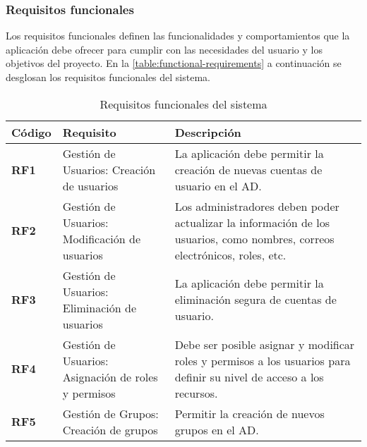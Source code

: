 \subsubsection{Requisitos funcionales}

Los requisitos funcionales definen las funcionalidades y comportamientos que la aplicación debe ofrecer para cumplir con las necesidades del usuario y los objetivos del proyecto. En la \autoref{table:functional-requirements} a continuación se desglosan los requisitos funcionales del sistema.



\begin{longtable}{|l|p{5cm}|p{8.5cm}|}
    \caption{Requisitos funcionales del sistema}
    \label{table:functional-requirements}                                                                                                                                                                                          \\
    \hline
    \textbf{Código} & \textbf{Requisito}                                                              & \textbf{Descripción}                                                                                                       \\
    \hline
    \endfirsthead
    \textbf{RF1}   & Gestión de Usuarios: Creación de usuarios                                       & La aplicación debe permitir la creación de nuevas cuentas de usuario en el AD.                                             \\ \hline
    \textbf{RF2}   & Gestión de Usuarios: Modificación de usuarios                                   & Los administradores deben poder actualizar la información de los usuarios, como nombres, correos electrónicos, roles, etc. \\ \hline
    \textbf{RF3}   & Gestión de Usuarios: Eliminación de usuarios                                    & La aplicación debe permitir la eliminación segura de cuentas de usuario.                                                   \\ \hline
    \textbf{RF4}   & Gestión de Usuarios: Asignación de roles y permisos                             & Debe ser posible asignar y modificar roles y permisos a los usuarios para definir su nivel de acceso a los recursos.       \\ \hline
    \textbf{RF5}   & Gestión de Grupos: Creación de grupos                                           & Permitir la creación de nuevos grupos en el AD.                                                                            \\ \hline

\end{longtable}
